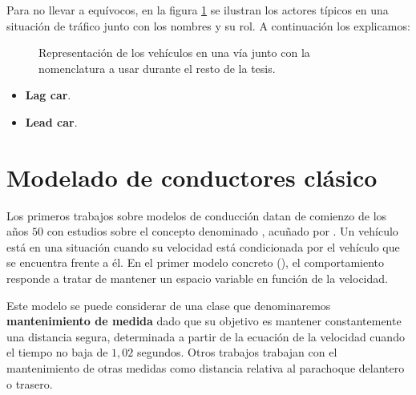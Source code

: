 Para no llevar a equívocos, en la figura \ref{fig:lane-representation-with-namings} se ilustran los actores típicos en una situación de tráfico junto con los nombres y su rol. A continuación los explicamos:

\begin{figure}
	\caption{Representación de los vehículos en una vía junto con la nomenclatura a usar durante el resto de la tesis.}
	\label{fig:lane-representation-with-namings}
\end{figure}

\begin{itemize}
	\item \textbf{Lag car}.
	\item \textbf{Lead car}.
\end{itemize}

\section{Modelado de conductores clásico}

Los primeros trabajos sobre modelos de conducción datan de comienzo de los años $50$ con estudios sobre el concepto denominado \textbf{}, acuñado por \cite{reuschel1950fahrzeugbewegungen}. Un vehículo está en una situación  cuando su velocidad está condicionada por el vehículo que se encuentra frente a él. En el primer modelo concreto (\cite{Pipes1953}), el comportamiento responde a tratar de mantener un espacio variable en función de la velocidad.

Este modelo se puede considerar de una clase que denominaremos \textbf{mantenimiento de medida} dado que su objetivo es mantener constantemente una distancia segura, determinada a partir de la ecuación de la velocidad cuando el tiempo no baja de $1,02$ segundos. Otros trabajos trabajan con el mantenimiento de otras medidas como distancia relativa al parachoque delantero o trasero.

